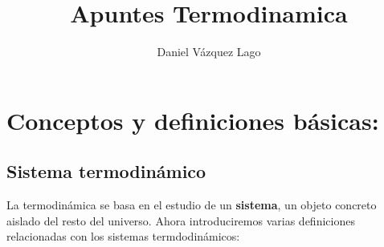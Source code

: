 \documentclass[12pt,a4paper]{article}
\author{Daniel Vázquez Lago}
\title{Apuntes Termodinamica}
\begin{document}
\maketitle

\newpage

\tableofcontents

\newpage

\section{Conceptos y definiciones básicas:}

\subsection{Sistema termodinámico}


La termodinámica se basa en el estudio de un \textbf{sistema}, un objeto concreto aislado del resto del universo. Ahora introduciremos varias definiciones relacionadas con los sistemas termdodinámicos:
\end{document}
